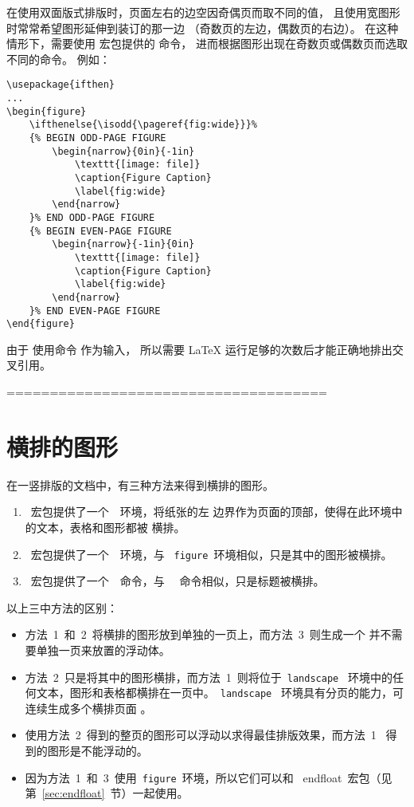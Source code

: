 在使用双面版式排版时，页面左右的边空因奇偶页而取不同的值，
且使用宽图形时常常希望图形延伸到装订的那一边
（奇数页的左边，偶数页的右边）。
在这种情形下，需要使用  宏包提供的  命令，
进而根据图形出现在奇数页或偶数页而选取不同的命令。
例如：
\begin{lstlisting}
\usepackage{ifthen}
...
\begin{figure}
	\ifthenelse{\isodd{\pageref{fig:wide}}}%
	{% BEGIN ODD-PAGE FIGURE
		\begin{narrow}{0in}{-1in}
			\texttt{[image: file]}
			\caption{Figure Caption}
			\label{fig:wide}
		\end{narrow}
	}% END ODD-PAGE FIGURE
	{% BEGIN EVEN-PAGE FIGURE
		\begin{narrow}{-1in}{0in}
			\texttt{[image: file]}
			\caption{Figure Caption}
			\label{fig:wide}
		\end{narrow}
	}% END EVEN-PAGE FIGURE
\end{figure}
\end{lstlisting}
由于  使用命令  作为输入，
所以需要 \LaTeX{} 运行足够的次数后才能正确地排出交叉引用。

=====================================
\section{横排的图形}

\noindent 在一竖排版的文档中，有三种方法来得到横排的图形。
\begin{enumerate}
	\item {}~宏包提供了一个~~环境，将纸张的左
	边界作为页面的顶部，使得在此环境中的文本，表格和图形都被
	横排。
	\item {}~宏包提供了一个~~环境，与
	~\texttt{figure}~环境相似，只是其中的图形被横排。
	\item {}~宏包提供了一个~~命令，与
	~~命令相似，只是标题被横排。
\end{enumerate}

\noindent 以上三中方法的区别：
\begin{itemize}
	\item 方法~1~和~2~将横排的图形放到单独的一页上，而方法~3~则生成一个
	并不需要单独一页来放置的浮动体。
	\item 方法~2~只是将其中的图形横排，而方法~1~则将位于~\texttt{landscape}~
	环境中的任何文本，图形和表格都横排在一页中。~\texttt{landscape}~
	环境具有分页的能力，可连续生成多个横排页面
	。
	\item 使用方法~2~得到的整页的图形可以浮动以求得最佳排版效果，而方法~1~
	得到的图形是不能浮动的。
	\item 因为方法~1~和~3~使用~\texttt{figure}~环境，所以它们可以和
	~\textsf{endfloat}~宏包（见第~\ref{sec:endfloat}~节）一起使用。
\end{itemize}

